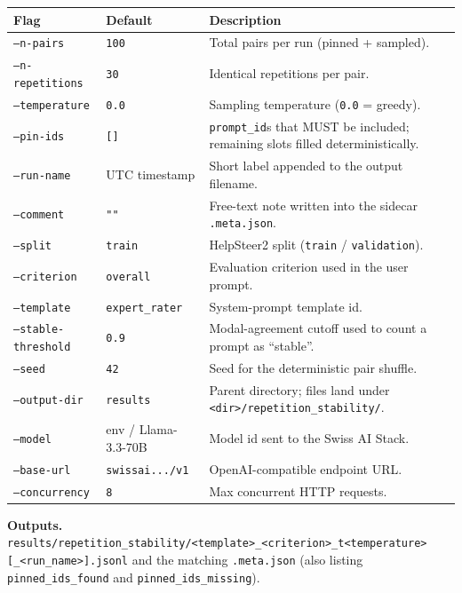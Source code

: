 \begin{longtable}{@{}llp{7.5cm}@{}}
  \toprule
  \textbf{Flag} & \textbf{Default} & \textbf{Description} \\
  \midrule \endhead
  \texttt{--n-pairs}          & \texttt{100}           & Total pairs per run (pinned + sampled). \\
  \texttt{--n-repetitions}    & \texttt{30}            & Identical repetitions per pair. \\
  \texttt{--temperature}      & \texttt{0.0}           & Sampling temperature (\texttt{0.0} = greedy). \\
  \texttt{--pin-ids}          & \texttt{[]}            & \texttt{prompt\_id}s that MUST be included; remaining slots filled deterministically. \\
  \texttt{--run-name}         & UTC timestamp          & Short label appended to the output filename. \\
  \texttt{--comment}          & \texttt{""}          & Free-text note written into the sidecar \texttt{.meta.json}. \\
  \texttt{--split}            & \texttt{train}         & HelpSteer2 split (\texttt{train} / \texttt{validation}). \\
  \texttt{--criterion}        & \texttt{overall}       & Evaluation criterion used in the user prompt. \\
  \texttt{--template}         & \texttt{expert\_rater} & System-prompt template id. \\
  \texttt{--stable-threshold} & \texttt{0.9}           & Modal-agreement cutoff used to count a prompt as ``stable''. \\
  \texttt{--seed}             & \texttt{42}            & Seed for the deterministic pair shuffle. \\
  \texttt{--output-dir}       & \texttt{results}       & Parent directory; files land under \texttt{<dir>/repetition\_stability/}. \\
  \texttt{--model}            & env / Llama-3.3-70B    & Model id sent to the Swiss AI Stack. \\
  \texttt{--base-url}         & \texttt{swissai.../v1}   & OpenAI-compatible endpoint URL. \\
  \texttt{--concurrency}      & \texttt{8}             & Max concurrent HTTP requests. \\
  \bottomrule
\end{longtable}

\textbf{Outputs.} \texttt{results/repetition\_stability/<template>\_<criterion>\_t<temperature>[\_<run\_name>].jsonl}
and the matching \texttt{.meta.json} (also listing \texttt{pinned\_ids\_found}
and \texttt{pinned\_ids\_missing}).


